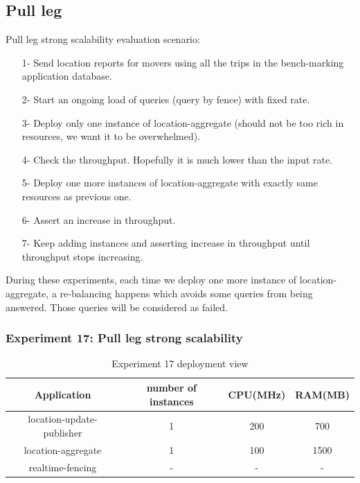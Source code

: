 \documentclass[a4]{report}
\begin{document}
    \subsection{Pull leg}
    Pull leg strong scalability evaluation scenario:
    \begin{itemize}
        \item[1-] Send location reports for movers using all the trips in the bench-marking application database.
        \item[2-] Start an ongoing load of queries (query by fence) with fixed rate.
        \item[3-] Deploy only one instance of location-aggregate (should not be too rich in resources, we want it to be
        overwhelmed).
        \item[4-] Check the throughput.
        Hopefully it is much lower than the input rate.
        \item[5-] Deploy one more instances of location-aggregate with exactly same resources as previous one.
        \item[6-] Assert an increase in throughput.
        \item[7-] Keep adding instances and asserting increase in throughput until throughput stops increasing.
    \end{itemize}

    During these experiments, each time we deploy one more instance of location-aggregate, a re-balancing happens which
    avoids some queries from being answered.
    Those queries will be considered as failed.

    \subsubsection{Experiment 17: Pull leg strong scalability}
    \begin{table}[h!]
        \centering
        \begin{tabular}{|c|c|c|c|}
            \hline
            Application               & number of instances & CPU(MHz) & RAM(MB) \\
            \hline
            location-update-publisher & 1                   & 200      & 700     \\
            location-aggregate        & 1                   & 100      & 1500    \\
            realtime-fencing          & -                   & -        & -       \\
            \hline
        \end{tabular}
        \caption{Experiment 17 deployment view}
        \label{table:ex17-dv}
    \end{table}
\end{document}
